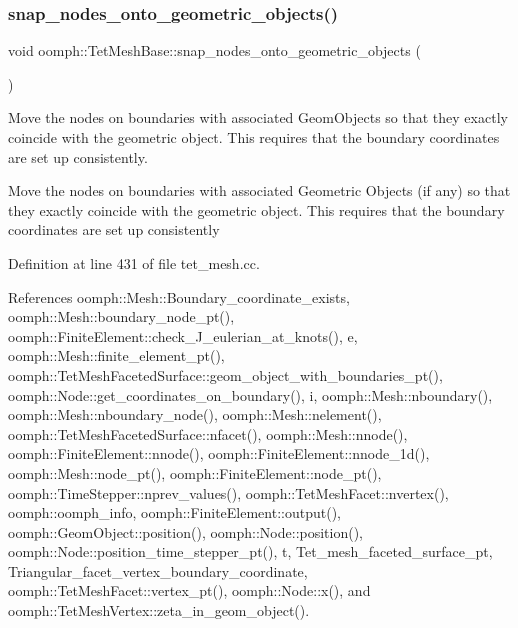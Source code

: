 \subsubsection{\texorpdfstring{snap\+\_\+nodes\+\_\+onto\+\_\+geometric\+\_\+objects()}{snap\_nodes\_onto\_geometric\_objects()}}
{\footnotesize\ttfamily void oomph\+::\+Tet\+Mesh\+Base\+::snap\+\_\+nodes\+\_\+onto\+\_\+geometric\+\_\+objects (\begin{DoxyParamCaption}{ }\end{DoxyParamCaption})}



Move the nodes on boundaries with associated Geom\+Objects so that they exactly coincide with the geometric object. This requires that the boundary coordinates are set up consistently. 

Move the nodes on boundaries with associated Geometric Objects (if any) so that they exactly coincide with the geometric object. This requires that the boundary coordinates are set up consistently 

Definition at line 431 of file tet\+\_\+mesh.\+cc.



References oomph\+::\+Mesh\+::\+Boundary\+\_\+coordinate\+\_\+exists, oomph\+::\+Mesh\+::boundary\+\_\+node\+\_\+pt(), oomph\+::\+Finite\+Element\+::check\+\_\+\+J\+\_\+eulerian\+\_\+at\+\_\+knots(), e, oomph\+::\+Mesh\+::finite\+\_\+element\+\_\+pt(), oomph\+::\+Tet\+Mesh\+Faceted\+Surface\+::geom\+\_\+object\+\_\+with\+\_\+boundaries\+\_\+pt(), oomph\+::\+Node\+::get\+\_\+coordinates\+\_\+on\+\_\+boundary(), i, oomph\+::\+Mesh\+::nboundary(), oomph\+::\+Mesh\+::nboundary\+\_\+node(), oomph\+::\+Mesh\+::nelement(), oomph\+::\+Tet\+Mesh\+Faceted\+Surface\+::nfacet(), oomph\+::\+Mesh\+::nnode(), oomph\+::\+Finite\+Element\+::nnode(), oomph\+::\+Finite\+Element\+::nnode\+\_\+1d(), oomph\+::\+Mesh\+::node\+\_\+pt(), oomph\+::\+Finite\+Element\+::node\+\_\+pt(), oomph\+::\+Time\+Stepper\+::nprev\+\_\+values(), oomph\+::\+Tet\+Mesh\+Facet\+::nvertex(), oomph\+::oomph\+\_\+info, oomph\+::\+Finite\+Element\+::output(), oomph\+::\+Geom\+Object\+::position(), oomph\+::\+Node\+::position(), oomph\+::\+Node\+::position\+\_\+time\+\_\+stepper\+\_\+pt(), t, Tet\+\_\+mesh\+\_\+faceted\+\_\+surface\+\_\+pt, Triangular\+\_\+facet\+\_\+vertex\+\_\+boundary\+\_\+coordinate, oomph\+::\+Tet\+Mesh\+Facet\+::vertex\+\_\+pt(), oomph\+::\+Node\+::x(), and oomph\+::\+Tet\+Mesh\+Vertex\+::zeta\+\_\+in\+\_\+geom\+\_\+object().



